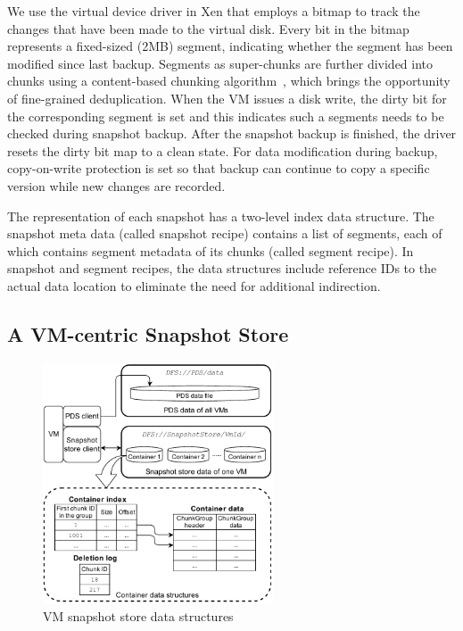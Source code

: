 We use the virtual device driver in Xen that employs a bitmap to track the changes 
that have been made to the virtual disk.
Every bit in the bitmap represents a fixed-sized (2MB) segment, indicating whether the segment
has been modified since last backup. 
Segments as super-chunks are further divided into chunks 
using a content-based chunking algorithm~\cite{frame05}, 
which brings the opportunity of fine-grained deduplication.
When the VM issues a disk write, the dirty bit for the corresponding segment is set
and this indicates such a segments needs to be checked during snapshot backup. 
After the snapshot backup is finished, the driver resets the dirty bit map to a clean state.
For data modification during backup, copy-on-write protection is set so that backup can continue to
copy  a specific version while new changes are recorded.

The representation of each snapshot has  a two-level index data structure.
The snapshot meta data (called snapshot recipe) contains a list of segments, each of which contains segment
metadata of its chunks (called segment recipe).
In snapshot and segment recipes, 
the data structures  include reference IDs to the actual data location to eliminate the need for additional indirection.


\subsection{A VM-centric Snapshot Store}
\label{sect:store}

\begin{figure}[htbp]
  \centering
  \includegraphics[width=2.7in]{images/sstore_arch}
  \centering
  \caption{VM snapshot store data structures}
  \label{fig:as_arch}
\end{figure}


